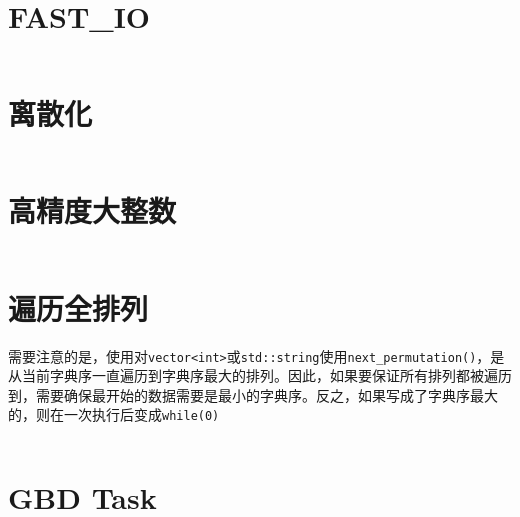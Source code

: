 \documentclass[openany,a4paper]{book}
\begin{document}
\section{FAST\_IO}
\inputminted{cpp}{Misc/fast_io.h}

\section{离散化}
\inputminted{cpp}{Misc/Discretize.h}

\section{高精度大整数}
\inputminted{cpp}{Misc/BigInt.h}

\section{遍历全排列}
需要注意的是，使用对\verb|vector<int>|或\verb|std::string|使用\verb|next_permutation()|，是从当前字典序一直遍历到字典序最大的排列。因此，如果要保证所有排列都被遍历到，需要确保最开始的数据需要是最小的字典序。反之，如果写成了字典序最大的，则在一次执行后变成\verb|while(0)|
\inputminted{cpp}{Misc/next_permutation.h}

\section{GBD Task}
\inputminted{json}{Misc/GDB-Task.json}
\end{document}
